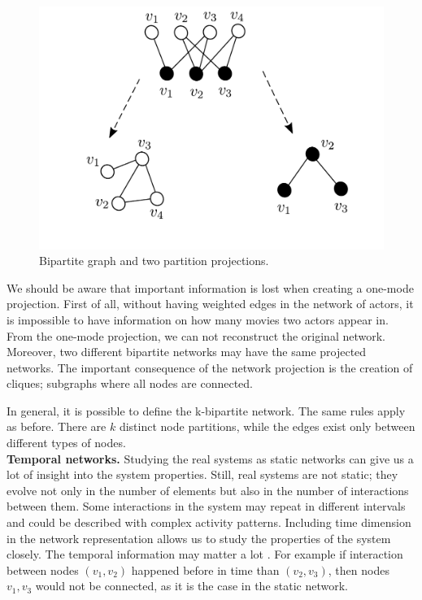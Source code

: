 \begin{figure}[h!]
	\centering
	\includegraphics[width=0.7\linewidth]{figures/methodology/bipartite_graph.pdf} 
	\caption{Bipartite graph and two partition projections.}
	\label{fig:gt2}
\end{figure}

We should be aware that important information is lost when creating a one-mode projection. First of all, without having weighted edges in the network of actors, it is impossible to have information on how many movies two actors appear in. From the one-mode projection, we can not reconstruct the original network. Moreover, two different bipartite networks may have the same projected networks. The important consequence of the network projection is the creation of cliques; subgraphs where all nodes are connected. 

In general, it is possible to define the k-bipartite network. The same rules apply as before. There are $k$ distinct node partitions, while the edges exist only between different types of nodes.\\




\textbf{Temporal networks.}
Studying the real systems as static networks can give us a lot of insight into the system properties. Still, real systems are not static; they evolve not only in the number of elements but also in the number of interactions between them. Some interactions in the system may repeat in different intervals and could be described with complex activity patterns. Including time dimension in the network representation allows us to study the properties of the system closely. The temporal information may matter a lot \cite{holme2012}. For example if interaction between nodes $(v_1, v_2)$ happened before in time than  $(v_2, v_3)$, then nodes $v_1, v_3$ would not be connected, as it is the case in the static network. 


